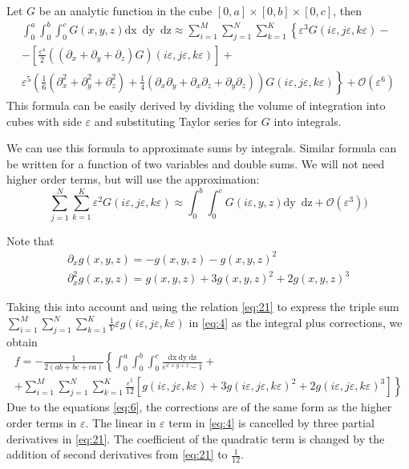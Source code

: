 \documentclass{article}
\newcommand{\dx}{\mathrm{dx}~}
\newcommand{\dy}{\mathrm{dy}~}
\newcommand{\dz}{\mathrm{dz}}
\begin{document}
Let $G$ be an analytic function in the cube $[0,a]\times[0,b]\times[0,c]$, then
\begin{multline}
  \label{eq:21}
  \int_{0}^{a} \int_{0}^{b}\int_{0}^{c}G(x,y,z) \dx\; \dy\;
  \dz\approx\sum_{i=1}^{M}\sum_{j=1}^{N}\sum_{k=1}^{K}\left\{\varepsilon^{3}G\left(i\varepsilon,j\varepsilon,k\varepsilon\right)-\right.\\
  \left.-\left[\frac{\varepsilon^{4}}{2}\left((\partial_{x}+\partial_{y}+\partial_{z})G\right)(i\varepsilon,j\varepsilon,k\varepsilon)\right]+\right.\\
  \left.\varepsilon^{5}\left(\frac{1}{6}(\partial_{x}^{2}+\partial_{y}^{2}+\partial_{z}^{2})+\frac{1}{4}(\partial_{x}\partial_{y}+\partial_{x}\partial_{z}+\partial_{y}\partial_{z})\right)G\left(i\varepsilon,j\varepsilon,k\varepsilon\right)
  \right\}+\mathcal{O}(\varepsilon^{6})
\end{multline}
This formula can be easily derived by dividing the volume of integration into cubes with side
$\varepsilon$ and substituting Taylor series for $G$ into integrals.

We can use this formula to approximate sums by integrals. Similar formula can be written for a
function of two variables and double sums. We will not need higher order terms, but will use the
approximation:
\begin{equation}
\label{eq:8}
  \sum_{j=1}^{N}\sum_{k=1}^{K}\varepsilon^{2}G\left(i\varepsilon,j\varepsilon,k\varepsilon\right)\approx \int_{0}^{b}\int_{0}^{c}G(i\varepsilon,y,z) \dy\; \dz+\mathcal{O}(\varepsilon^{3}))
\end{equation}



Note that
\begin{equation}
  \label{eq:6}
  \begin{array}{c}
    \partial_{x}g(x,y,z)=-g(x,y,z)-g(x,y,z)^{2}\\
    \partial_{x}^{2}g(x,y,z)=g(x,y,z)+3g(x,y,z)^{2}+2g(x,y,z)^{3}
  \end{array}
\end{equation}

Taking this into account and using the relation \eqref{eq:21} to express the triple sum
$ \sum_{i=1}^{M} \sum_{j=1}^{N} \sum_{k=1}^{K} \frac{1}{V}    \varepsilon g(i\varepsilon,j\varepsilon,k\varepsilon)$
in \eqref{eq:4} as the integral plus corrections, we obtain
\begin{multline}
\label{eq:23}
 f=-\frac{1}{2(ab+bc+ca)}\left\{\int_{0}^{a} \int_{0}^{b}\int_{0}^{c}\frac{\dx \dy \dz}{e^{x+y+z}-1}+\right.\\
  \left.+\sum_{i=1}^{M}\sum_{j=1}^{N}\sum_{k=1}^{K}\frac{\varepsilon^{5}}{12}\left[g(i\varepsilon,j\varepsilon,k\varepsilon)+3
      g(i\varepsilon,j\varepsilon,k\varepsilon)^{2}+2
      g(i\varepsilon,j\varepsilon,k\varepsilon)^{3}\right]\right\}
\end{multline}
Due to the equations \eqref{eq:6}, the corrections are of the same form as the higher order terms in
$\varepsilon$. The linear in $\varepsilon$ term in \eqref{eq:4} is cancelled by three partial
derivatives in \eqref{eq:21}. The coefficient of the quadratic term is changed by the addition of
second derivatives from \eqref{eq:21} to $\frac{1}{12}$.
\end{document}
